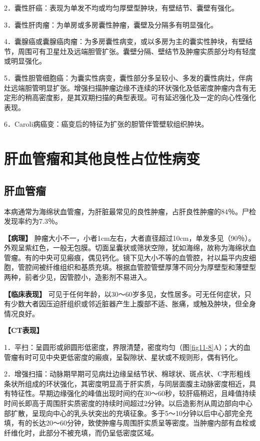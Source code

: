 2．囊性肝癌：表现为单发不均或均匀厚壁型肿块，有壁结节、囊壁有强化。

3．囊性肝肉瘤：为单房或多房囊性肿瘤，囊壁及分隔多有明显强化。

4．囊腺癌或囊腺癌肉瘤：为多房囊性病变，或以多房为主的囊实性肿块，有壁结节，周围可有卫星灶及远端胆管扩张。囊壁分隔、壁结节及肿瘤实质部分均有轻度或明显强化。

5．囊性胆管细胞癌：为囊实性病变，囊性部分多呈较小、多发的囊性病灶，伴病灶远端胆管明显扩张。增强扫描肿瘤边缘不连续的环状强化及低密度肿瘤内含有无定形的稍高密度影，是其双期扫描的典型表现。可有延迟强化及一定的向心性强化表现。

6．Caroli病癌变：癌变后的特征为扩张的胆管伴管壁软组织肿块。

\section{肝血管瘤和其他良性占位性病变}

\subsection{肝血管瘤}

本病通常为海绵状血管瘤，为肝脏最常见的良性肿瘤，占肝良性肿瘤的84％。尸检发现率约为7.3％。

\textbf{【病理】}
肿瘤大小不一，小者1cm左右，大者直径超过10cm，单发多见（90％）。外观呈紫红色，一般无包膜。切面呈囊状或筛状空隙，犹如海绵，故称为海绵状血管瘤。有的中央可见瘢痕，偶见钙化。镜下见大小不等的血管腔，衬以扁平内皮细胞，管腔间被纤维组织和基质充填。根据血管腔管壁厚薄不同分为厚壁型和薄壁型两种，前者少见，因管腔小，造影剂不易进入。

\textbf{【临床表现】}
可见于任何年龄，以30～60岁多见，女性居多。可无任何症状，只有少数大者因压迫肝组织或邻近脏器产生上腹部不适、胀痛，或触及肿块，但全身情况良好。

\textbf{【CT表现】}

1．平扫：呈圆形或卵圆形低密度，界限清楚，密度均匀（图\ref{fig11-8}A）；大的血管瘤有时可见中央更低密度的瘢痕，呈裂隙状、星状或不规则形，偶有钙化。

2．增强扫描：动脉期早期可见病灶边缘呈结节状、棉球状、斑点状、C字形粗线条状所组成的环状强化，其密度明显高于肝实质，与同层面腹主动脉密度相近，具有特征性。早期边缘强化的峰值出现时间约在30～60秒，较肝癌稍迟，且峰值持续时间长即高于周围肝实质密度的持续时间超过2分钟。以后造影剂从周边部向中心部扩散，呈现向中心的乳头状突出的充填征象。多于5～10分钟以后中心部完全充填，有的长达20～60分钟，致使肿瘤与周围肝实质呈等密度。当肿瘤内部有血栓或纤维化时，此部分不被充填，而仍呈低密度区域。

